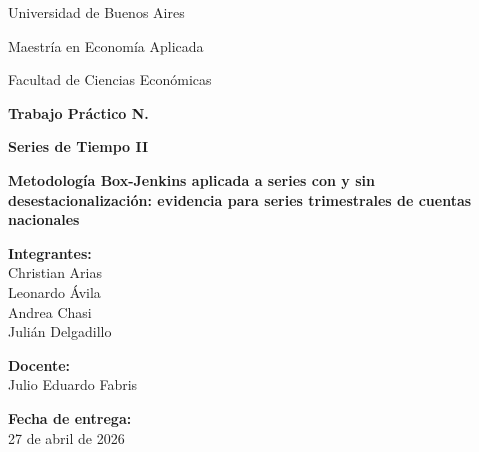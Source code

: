 \documentclass[12pt,a4paper]{article}
\begin{document}
	
	\begin{titlepage}
		\centering
		
		{\large Universidad de Buenos Aires \par}
		\vspace{0.3cm}
		{\large Maestría en Economía Aplicada \par}
		\vspace{0.3cm}
		{\large Facultad de Ciencias Económicas \par}
		
		\vspace{2.0cm}
		
		{\Large \textbf{Trabajo Práctico N.} \par}
		\vspace{0.5cm}
		{\large \textbf{Series de Tiempo II} \par}
		
		\vspace{1.5cm}
		
		{\Large \textbf{Metodología Box-Jenkins aplicada a series con y sin desestacionalización: evidencia para series trimestrales de cuentas nacionales} \par}
		
		\vspace{2cm}
		
		\begin{flushleft}
			\textbf{Integrantes:} \\
			Christian Arias \\
			Leonardo Ávila \\
			Andrea Chasi \\
			Julián Delgadillo
			
			\vspace{0.8cm}
			
			\textbf{Docente:} \\
			Julio Eduardo Fabris
			
			\vspace{0.8cm}
			
			\textbf{Fecha de entrega:} \\
			27 de abril de 2026
		\end{flushleft}
		
		\vfill
		
	\end{titlepage}
	
\end{document}
